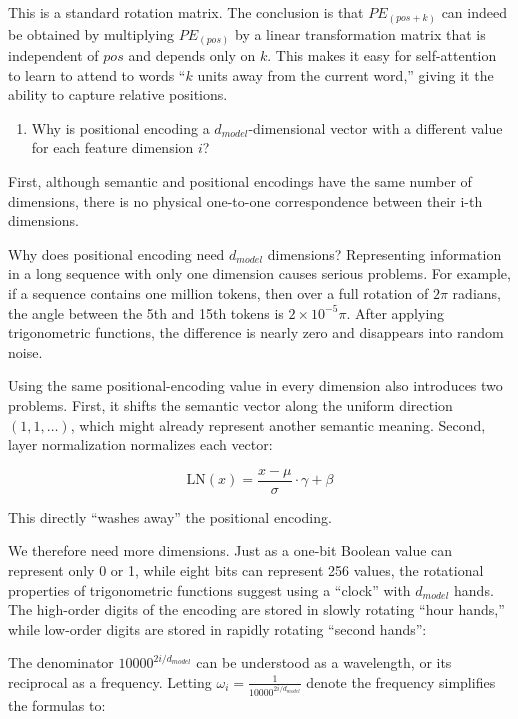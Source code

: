 This is a standard rotation matrix. The conclusion is that \(PE_{(pos+k)}\) can indeed be obtained by multiplying \(PE_{(pos)}\) by a linear transformation matrix that is independent of \(pos\) and depends only on \(k\). This makes it easy for self-attention to learn to attend to words ``\(k\) units away from the current word,'' giving it the ability to capture relative positions.

\begin{enumerate}
\def\labelenumi{\arabic{enumi}.}
\setcounter{enumi}{1}
\tightlist
\item
  Why is positional encoding a \(d_{model}\)-dimensional vector with a different value for each feature dimension \(i\)?
\end{enumerate}

First, although semantic and positional encodings have the same number of dimensions, there is no physical one-to-one correspondence between their i-th dimensions.

Why does positional encoding need \(d_{model}\) dimensions? Representing information in a long sequence with only one dimension causes serious problems. For example, if a sequence contains one million tokens, then over a full rotation of \(2\pi\) radians, the angle between the 5th and 15th tokens is \(2 \times 10^{-5}\pi\). After applying trigonometric functions, the difference is nearly zero and disappears into random noise.

Using the same positional-encoding value in every dimension also introduces two problems. First, it shifts the semantic vector along the uniform direction \((1,1,\ldots)\), which might already represent another semantic meaning. Second, layer normalization normalizes each vector:

\[
\mathrm{LN}(x)=\frac{x-\mu}{\sigma}\cdot\gamma+\beta
\]

This directly ``washes away'' the positional encoding.

We therefore need more dimensions. Just as a one-bit Boolean value can represent only 0 or 1, while eight bits can represent 256 values, the rotational properties of trigonometric functions suggest using a ``clock'' with \(d_{model}\) hands. The high-order digits of the encoding are stored in slowly rotating ``hour hands,'' while low-order digits are stored in rapidly rotating ``second hands'':

The denominator \(10000^{2i/d_{model}}\) can be understood as a wavelength, or its reciprocal as a frequency. Letting \(\omega_i=\frac{1}{10000^{2i/d_{model}}}\) denote the frequency simplifies the formulas to:

